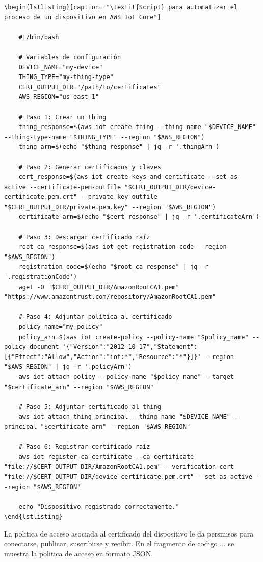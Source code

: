 \begin{verbatim}
\begin{lstlisting}[caption= "\textit{Script} para automatizar el proceso de un dispositivo en AWS IoT Core"]

	#!/bin/bash

	# Variables de configuración
	DEVICE_NAME="my-device"
	THING_TYPE="my-thing-type"
	CERT_OUTPUT_DIR="/path/to/certificates"
	AWS_REGION="us-east-1"

	# Paso 1: Crear un thing
	thing_response=$(aws iot create-thing --thing-name "$DEVICE_NAME" --thing-type-name "$THING_TYPE" --region "$AWS_REGION")
	thing_arn=$(echo "$thing_response" | jq -r '.thingArn')

	# Paso 2: Generar certificados y claves
	cert_response=$(aws iot create-keys-and-certificate --set-as-active --certificate-pem-outfile "$CERT_OUTPUT_DIR/device-		certificate.pem.crt" --private-key-outfile "$CERT_OUTPUT_DIR/private.pem.key" --region "$AWS_REGION")
	certificate_arn=$(echo "$cert_response" | jq -r '.certificateArn')

	# Paso 3: Descargar certificado raíz
	root_ca_response=$(aws iot get-registration-code --region "$AWS_REGION")
	registration_code=$(echo "$root_ca_response" | jq -r '.registrationCode')
	wget -O "$CERT_OUTPUT_DIR/AmazonRootCA1.pem" "https://www.amazontrust.com/repository/AmazonRootCA1.pem"

	# Paso 4: Adjuntar política al certificado
	policy_name="my-policy"
	policy_arn=$(aws iot create-policy --policy-name "$policy_name" --policy-document '{"Version":"2012-10-17","Statement":	[{"Effect":"Allow","Action":"iot:*","Resource":"*"}]}' --region "$AWS_REGION" | jq -r '.policyArn')
	aws iot attach-policy --policy-name "$policy_name" --target "$certificate_arn" --region "$AWS_REGION"

	# Paso 5: Adjuntar certificado al thing
	aws iot attach-thing-principal --thing-name "$DEVICE_NAME" --principal "$certificate_arn" --region "$AWS_REGION"

	# Paso 6: Registrar certificado raíz
	aws iot register-ca-certificate --ca-certificate "file://$CERT_OUTPUT_DIR/AmazonRootCA1.pem" --verification-cert 	"file://$CERT_OUTPUT_DIR/device-certificate.pem.crt" --set-as-active --region "$AWS_REGION"

	echo "Dispositivo registrado correctamente."
\end{lstlisting}
\end{verbatim}

La politica de acceso asociada al certificado del dispositivo le da persmisos para conectarse, publicar, suscribirse y recibir. En el fragmento de codigo ... se muestra la politica de acceso en formato JSON.

